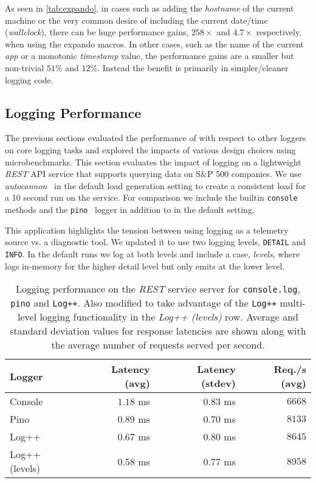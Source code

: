As seen in \autoref{tab:expando}, in cases such as adding the \emph{hostname} of the current machine 
or the very common desire of including the current date/time (\emph{wallclock}), there can be huge 
performance gains, $258\times$ and $4.7\times$ respectively, when using the expando macros. In other cases, 
such as the name of the current \emph{app} or a monotonic \emph{timestamp} value, the performance 
gains are a smaller but non-trivial $51\%$ and $12\%$. Instead the benefit is primarily in simpler/cleaner
logging code.

\subsection{Logging Performance}
The previous sections evaluated the performance of \projn with respect to other 
loggers on core logging tasks and explored the impacts of various design 
choices using microbenchmarks. This section evaluates the impact of logging on 
a lightweight \emph{REST} API service that supports querying data on S\&P 500 
companies. 
We use \emph{autocannon}~\cite{autocannon} in the default load generation 
setting to create a consistent load for a 10 second run on the service.
For comparison we include the builtin \texttt{console} methods 
and the \texttt{pino}~\cite{pino} logger in addition to \projn in the default 
setting.

This application highlights the tension between using logging as a telemetry source 
vs. a diagnostic tool. We updated it to use two logging levels, \texttt{DETAIL} 
and \texttt{INFO}. In the default runs we log at both levels and include a case, 
\emph{levels}, where \projn logs in-memory for the higher detail level but only 
emits at the lower level.

\begin{table}[t]  
    \centering
    \caption{\small Logging performance on the \emph{REST} service server for \texttt{console.log}, 
    \texttt{pino} and \texttt{Log++}. Also modified to take advantage of the \texttt{Log++} 
    multi-level logging functionality in the \emph{Log++ (levels)} row. Average and 
    standard deviation values for response latencies are shown along with the average 
    number of requests served per second.}
    {\small
    \begin{tabular}{l | r r r }
    Logger       & Latency (avg) & Latency (stdev) & Req./s (avg) \\
    \hline
    Console        & $1.18$ ms & $0.83$ ms & $6668$   \\
    Pino           & $0.89$ ms & $0.70$ ms & $8133$   \\
    Log++          & $0.67$ ms & $0.80$ ms & $8645$   \\
    Log++ (levels) & $0.58$ ms & $0.77$ ms & $8958$   \\
    \end{tabular}
    }
    \label{tab:server}
\end{table}

